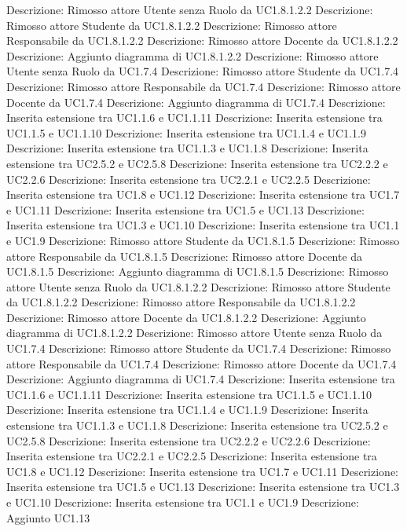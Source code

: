 Descrizione: Rimosso attore Utente senza Ruolo da UC1.8.1.2.2 
Descrizione: Rimosso attore Studente da UC1.8.1.2.2 
Descrizione: Rimosso attore Responsabile da UC1.8.1.2.2 
Descrizione: Rimosso attore Docente da UC1.8.1.2.2 
Descrizione: Aggiunto diagramma di UC1.8.1.2.2 
Descrizione: Rimosso attore Utente senza Ruolo da UC1.7.4 
Descrizione: Rimosso attore Studente da UC1.7.4 
Descrizione: Rimosso attore Responsabile da UC1.7.4 
Descrizione: Rimosso attore Docente da UC1.7.4 
Descrizione: Aggiunto diagramma di UC1.7.4 
Descrizione: Inserita estensione tra UC1.1.6 e UC1.1.11 
Descrizione: Inserita estensione tra UC1.1.5 e UC1.1.10 
Descrizione: Inserita estensione tra UC1.1.4 e UC1.1.9 
Descrizione: Inserita estensione tra UC1.1.3 e UC1.1.8 
Descrizione: Inserita estensione tra UC2.5.2 e UC2.5.8 
Descrizione: Inserita estensione tra UC2.2.2 e UC2.2.6 
Descrizione: Inserita estensione tra UC2.2.1 e UC2.2.5 
Descrizione: Inserita estensione tra UC1.8 e UC1.12 
Descrizione: Inserita estensione tra UC1.7 e UC1.11 
Descrizione: Inserita estensione tra UC1.5 e UC1.13 
Descrizione: Inserita estensione tra UC1.3 e UC1.10 
Descrizione: Inserita estensione tra UC1.1 e UC1.9 
Descrizione: Rimosso attore Studente da UC1.8.1.5 
Descrizione: Rimosso attore Responsabile da UC1.8.1.5 
Descrizione: Rimosso attore Docente da UC1.8.1.5 
Descrizione: Aggiunto diagramma di UC1.8.1.5 
Descrizione: Rimosso attore Utente senza Ruolo da UC1.8.1.2.2 
Descrizione: Rimosso attore Studente da UC1.8.1.2.2 
Descrizione: Rimosso attore Responsabile da UC1.8.1.2.2 
Descrizione: Rimosso attore Docente da UC1.8.1.2.2 
Descrizione: Aggiunto diagramma di UC1.8.1.2.2 
Descrizione: Rimosso attore Utente senza Ruolo da UC1.7.4 
Descrizione: Rimosso attore Studente da UC1.7.4 
Descrizione: Rimosso attore Responsabile da UC1.7.4 
Descrizione: Rimosso attore Docente da UC1.7.4 
Descrizione: Aggiunto diagramma di UC1.7.4 
Descrizione: Inserita estensione tra UC1.1.6 e UC1.1.11 
Descrizione: Inserita estensione tra UC1.1.5 e UC1.1.10 
Descrizione: Inserita estensione tra UC1.1.4 e UC1.1.9 
Descrizione: Inserita estensione tra UC1.1.3 e UC1.1.8 
Descrizione: Inserita estensione tra UC2.5.2 e UC2.5.8 
Descrizione: Inserita estensione tra UC2.2.2 e UC2.2.6 
Descrizione: Inserita estensione tra UC2.2.1 e UC2.2.5 
Descrizione: Inserita estensione tra UC1.8 e UC1.12 
Descrizione: Inserita estensione tra UC1.7 e UC1.11 
Descrizione: Inserita estensione tra UC1.5 e UC1.13 
Descrizione: Inserita estensione tra UC1.3 e UC1.10 
Descrizione: Inserita estensione tra UC1.1 e UC1.9 
Descrizione: Aggiunto UC1.13 
